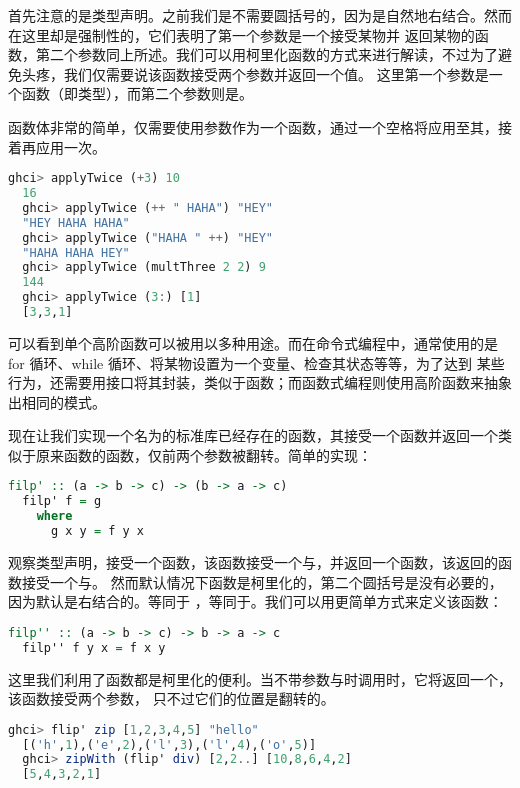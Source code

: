 \documentclass[./main.tex]{subfiles}
\begin{document}
首先注意的是类型声明。之前我们是不需要圆括号的，因为\acode{->}是自然地右结合。然而在这里却是强制性的，它们表明了第一个参数是一个接受某物并
返回某物的函数，第二个参数同上所述。我们可以用柯里化函数的方式来进行解读，不过为了避免头疼，我们仅需要说该函数接受两个参数并返回一个值。
这里第一个参数是一个函数（即类型），而第二个参数则是。

函数体非常的简单，仅需要使用参数作为一个函数，通过一个空格将应用至其，接着再应用一次。

\begin{lstlisting}[language=Haskell]
  ghci> applyTwice (+3) 10
  16
  ghci> applyTwice (++ " HAHA") "HEY"
  "HEY HAHA HAHA"
  ghci> applyTwice ("HAHA " ++) "HEY"
  "HAHA HAHA HEY"
  ghci> applyTwice (multThree 2 2) 9
  144
  ghci> applyTwice (3:) [1]
  [3,3,1]
\end{lstlisting}

可以看到单个高阶函数可以被用以多种用途。而在命令式编程中，通常使用的是 for 循环、while 循环、将某物设置为一个变量、检查其状态等等，为了达到
某些行为，还需要用接口将其封装，类似于函数；而函数式编程则使用高阶函数来抽象出相同的模式。

现在让我们实现一个名为的标准库已经存在的函数，其接受一个函数并返回一个类似于原来函数的函数，仅前两个参数被翻转。简单的实现：

\begin{lstlisting}[language=Haskell]
  filp' :: (a -> b -> c) -> (b -> a -> c)
  filp' f = g
    where
      g x y = f y x
\end{lstlisting}

观察类型声明，接受一个函数，该函数接受一个与，并返回一个函数，该返回的函数接受一个与。
然而默认情况下函数是柯里化的，第二个圆括号是没有必要的，因为\acode{->}默认是右结合的。等同于
，等同于。我们可以用更简单方式来定义该函数：

\begin{lstlisting}[language=Haskell]
  filp'' :: (a -> b -> c) -> b -> a -> c
  filp'' f y x = f x y
\end{lstlisting}

这里我们利用了函数都是柯里化的便利。当不带参数与时调用时，它将返回一个，该函数接受两个参数，
只不过它们的位置是翻转的。

\begin{lstlisting}[language=Haskell]
  ghci> flip' zip [1,2,3,4,5] "hello"
  [('h',1),('e',2),('l',3),('l',4),('o',5)]
  ghci> zipWith (flip' div) [2,2..] [10,8,6,4,2]
  [5,4,3,2,1]
\end{lstlisting}

\end{document}
